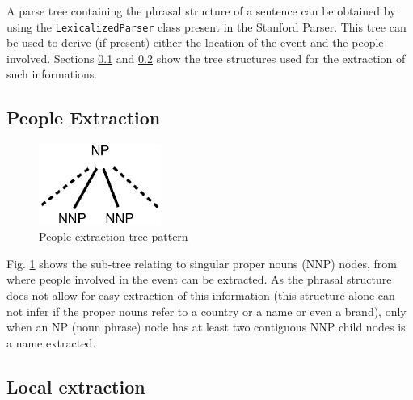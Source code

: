 \documentclass{llncs}
\begin{document}
A parse tree containing the phrasal structure of a sentence can be obtained by using the \verb!LexicalizedParser! class present in the Stanford Parser. This tree can be used to derive (if present) either the location of the event and the people involved. Sections \ref{chp:people-extraction} and \ref{chp:local-extraction} show the tree structures used for the extraction of such informations.

\subsection{People Extraction}
\label{chp:people-extraction}

\begin{figure}[h]
	\centering
	\includegraphics[width=40mm]{dia/people.eps}
	\caption{People extraction tree pattern}
	\label{fig:people-extraction}
\end{figure}

Fig. \ref{fig:people-extraction} shows the sub-tree relating to singular proper nouns (NNP) nodes, from where people involved in the event can be extracted. As the phrasal structure does not allow for easy extraction of this information (this structure alone can not infer if the proper nouns refer to a country or a name or even a brand), only when an NP (noun phrase) node has at least two contiguous NNP child nodes is a name extracted.

\newpage
\subsection{Local extraction}
\label{chp:local-extraction}
\end{document}
